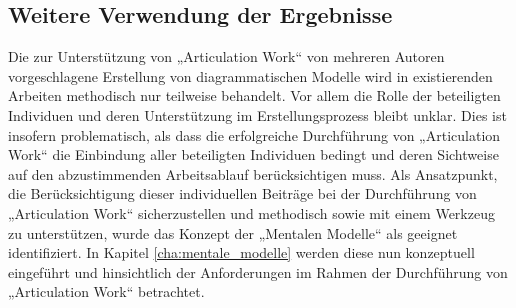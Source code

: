 \subsection{Weitere Verwendung der Ergebnisse}

Die zur Unterstützung von „Articulation Work“ von mehreren Autoren vorgeschlagene Erstellung von diagrammatischen Modelle wird in existierenden Arbeiten methodisch nur teilweise behandelt. Vor allem die Rolle der beteiligten Individuen und deren Unterstützung im Erstellungsprozess bleibt unklar. Dies ist insofern problematisch, als dass die erfolgreiche Durchführung von „Articulation Work“ die Einbindung aller beteiligten Individuen bedingt und deren Sichtweise auf den abzustimmenden Arbeitsablauf berücksichtigen muss. Als Ansatzpunkt, die Berücksichtigung dieser individuellen Beiträge bei der Durchführung von „Articulation Work“ sicherzustellen und methodisch sowie mit einem Werkzeug zu unterstützen, wurde das Konzept der „Mentalen Modelle“ als geeignet identifiziert. In Kapitel \ref{cha:mentale_modelle} werden diese nun konzeptuell eingeführt und hinsichtlich der Anforderungen im Rahmen der Durchführung von „Articulation Work“ betrachtet.


